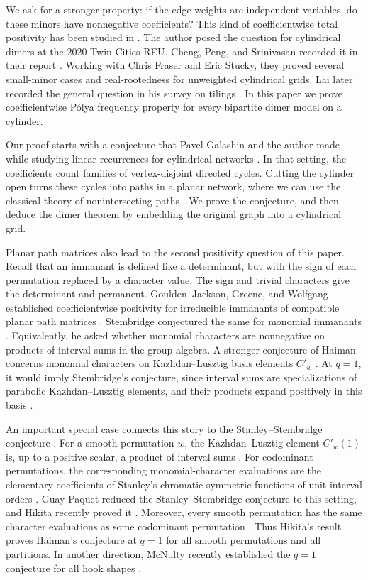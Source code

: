 \documentclass[11pt]{article}
\theoremstyle{definition}
\theoremstyle{remark}
\begin{document}
We ask for a stronger property: if the edge weights
are independent variables, do these minors have
nonnegative coefficients? This kind of
coefficientwise total positivity has been studied
in \cite{Brenti95,CDDGS}. The author posed the question for cylindrical dimers at
the 2020 Twin Cities REU. Cheng, Peng, and Srinivasan
recorded it in their report \cite[Question~1.9]{CPS}.
Working with Chris Fraser and Eric Stucky, they proved
several small-minor cases and real-rootedness for
unweighted cylindrical grids. Lai later recorded
the general question in his survey on tilings
\cite[Problem~32]{Lai}. In this paper we prove coefficientwise
P\'olya frequency property for every bipartite dimer model
on a cylinder.



Our proof starts with a conjecture that Pavel Galashin
and the author made while studying linear recurrences
for cylindrical networks \cite{GP}. In that setting,
the coefficients count families of vertex-disjoint
directed cycles. Cutting the cylinder open turns
these cycles into paths in a planar network, where
we can use the classical theory of nonintersecting
paths \cite{Lindstrom,GV}. We prove the conjecture, and then deduce the dimer theorem by
embedding the original graph into a cylindrical
grid.



Planar path matrices also lead to the second
positivity question of this paper. Recall that
an immanant is defined like a determinant, but
with the sign of each permutation replaced by
a character value. The sign and trivial characters
give the determinant and permanent. Goulden--Jackson,
Greene, and Wolfgang established coefficientwise
positivity for irreducible immanants of compatible
planar path matrices \cite{GJ,Greene,Wolfgang}.
Stembridge conjectured the same for monomial
immanants \cite{Stembridge92}. Equivalently, he
asked whether monomial characters are nonnegative
on products of interval sums in the group algebra.
A stronger conjecture of Haiman concerns monomial
characters on Kazhdan--Lusztig basis elements
$C'_w$ \cite{Haiman}. At $q=1$, it would imply
Stembridge's conjecture, since interval sums are
specializations of parabolic Kazhdan--Lusztig
elements, and their products expand positively
in this basis \cite{EW}.



An important special case connects this story to the
Stanley--Stembridge conjecture \cite{SS93}.
For a smooth permutation $w$, the Kazhdan--Lusztig
element $C'_w(1)$ is, up to a positive scalar,
a product of interval sums \cite{Skandera08}.
For codominant permutations, the corresponding
monomial-character evaluations are the elementary
coefficients of Stanley's chromatic symmetric
functions of unit interval orders
\cite{StanleyChrom,CHSS}. Guay-Paquet reduced
the Stanley--Stembridge conjecture to this setting,
and Hikita recently proved it
\cite{GuayPaquet,Hikita}. Moreover, every smooth
permutation has the same character evaluations
as some codominant permutation \cite{CHSS,AN}.
Thus Hikita's result proves Haiman's conjecture
at $q=1$ for all smooth permutations and all
partitions. In another direction, McNulty recently
established the $q=1$ conjecture for all hook
shapes \cite{McNulty}.
\end{document}
